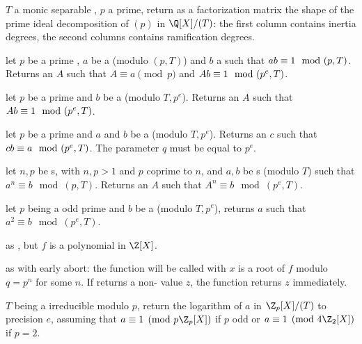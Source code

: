  $T$ a monic separable , $p$ a
prime, return as a factorization matrix the shape of the prime ideal
decomposition of $(p)$ in $\Q[X]/(T)$: the first column contains inertia
degrees, the second columns contains ramification degrees.


 let
$p$ be a prime , $a$ be a  (modulo $(p, T)$) and
$b$ a  such that $a\*b \equiv 1 \mod (p, T)$.
Returns an  $A$ such that $A \equiv a \pmod{p}$ and
$A\*b \equiv 1 \mod (p^e, T)$.

 let
$p$ be a prime  and $b$ be a  (modulo $T, p^e$).
Returns an  $A$ such that $A\*b \equiv 1 \mod (p^e, T)$.

 let
$p$ be a prime  and $a$ and $b$ be a  (modulo $T, p^e$).
Returns an  $c$ such that $c\*b \equiv a \mod (p^e, T)$.
The parameter $q$ must be equal to $p^e$.

 let
$n,p$ be s, with $n,p > 1$ and $p$ coprime to $n$, and $a,b$
be s (modulo $T$) such that $a^n \equiv b \mod (p,T)$.
Returns an  $A$ such that $A^n \equiv b \mod (p^e, T)$.

 let
$p$ being a odd prime and $b$ be a  (modulo $T, p^e$),
returns $a$ such that $a^2 \equiv b \mod (p^e, T)$.

as , but $f$ is a polynomial in $\Z[X]$.

as  with early abort: the function 
will be called with $x$ is a root of $f$ modulo $q=p^n$ for some $n$. If
 returns a non- value $z$, the function returns $z$
immediately.

 $T$ being a 
irreducible modulo $p$, return the logarithm of $a$ in $\Z_p[X]/(T)$ to
precision $e$, assuming that $a\equiv 1 \pmod{p\Z_p[X]}$ if $p$ odd or
$a\equiv 1 \pmod{4\Z_2[X]}$ if $p=2$.

